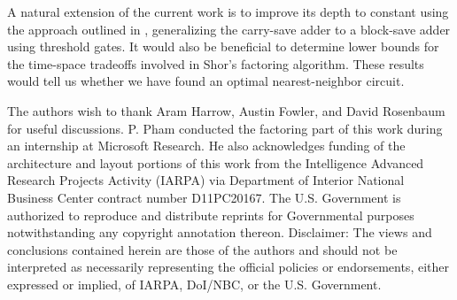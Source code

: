 \documentclass[twoside]{article}
\begin{document}

A natural extension of the current work is to improve its
depth to constant using the approach outlined in
\cite{Hoyer2002,Siu1993}, generalizing the carry-save adder to
a block-save adder using threshold gates. It would also be
beneficial to determine lower bounds for the
time-space tradeoffs involved in Shor's factoring algorithm.
These results would tell us whether we have found an
optimal nearest-neighbor circuit.

\noindent
The authors wish to thank Aram Harrow, Austin Fowler, and David Rosenbaum for
useful discussions.
P. Pham conducted the factoring part of this work during
an internship at Microsoft Research.
He also acknowledges funding of the architecture and layout portions
of this work from
the Intelligence Advanced Research Projects Activity
(IARPA) via Department of Interior National Business Center contract
number D11PC20167. The U.S. Government is authorized to reproduce and
distribute reprints for Governmental purposes notwithstanding any
copyright annotation thereon. Disclaimer: The views and conclusions
contained herein are those of the authors and should not be
interpreted as necessarily representing the official policies or
endorsements, either expressed or implied, of IARPA, DoI/NBC, or the
U.S. Government.

\noindent




\end{document}
